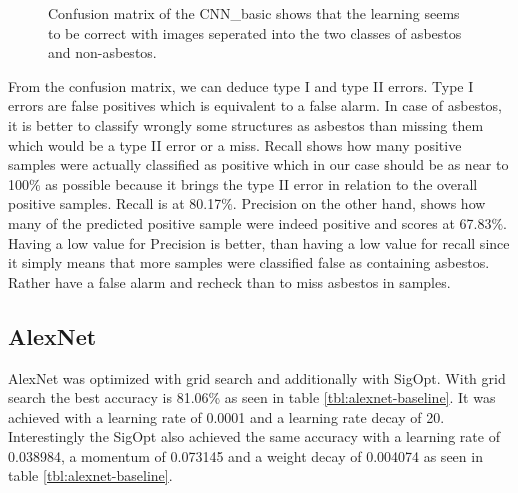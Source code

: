 \begin{figure}[h]
\centering
{}
\caption{Confusion matrix of the CNN\_basic shows that the learning seems to be correct with images seperated into the two classes of asbestos and non-asbestos.}
\label{fig:cnn-basic-cm}
\end{figure}


From the confusion matrix, we can deduce type I and type II errors. Type I errors are false positives which is equivalent to a false alarm. In case of asbestos, it is better to classify wrongly some structures as asbestos than missing them which would be a type II error or a miss. Recall shows how many positive samples were actually classified as positive which in our case should be as near to 100\% as possible because it brings the type II error in relation to the overall positive samples. Recall is at 80.17\%. Precision on the other hand, shows how many of the predicted positive sample were indeed positive and scores at 67.83\%. Having a low value for Precision is better, than having a low value for recall since it simply means that more samples were classified false as containing asbestos. Rather have a false alarm and recheck than to miss asbestos in samples.














\subsection{AlexNet}

AlexNet was optimized with grid search and additionally with SigOpt. With grid search the best accuracy is 81.06\% as seen in table \ref{tbl:alexnet-baseline}. It was achieved with a learning rate of 0.0001 and a learning rate decay of 20. Interestingly the SigOpt also achieved the same accuracy with a learning rate of 0.038984, a momentum of 0.073145 and a weight decay of 0.004074 as seen in table \ref{tbl:alexnet-baseline}.



